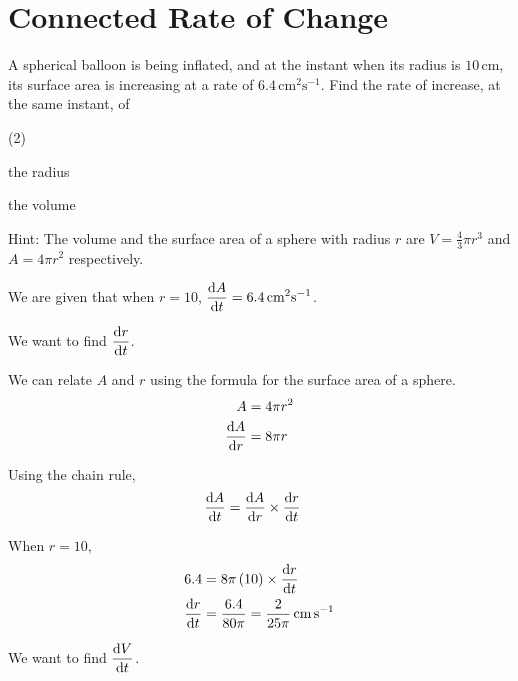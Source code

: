\documentclass[11pt,a4paper]{book}
\begin{document}
\newpage{}

\section{Connected Rate of Change}

\begin{example}

A spherical balloon is being inflated, and at the instant when its
radius is $10\,\text{cm}$, its surface area is increasing at a rate
of $6.4\,\text{cm}^{2}\text{s}^{-1}$. Find the rate of increase, at the same instant, of

\begin{tasks}[label=(\alph*),label-width=3.5ex](2)

\task  the radius

\task  the volume

\end{tasks}

Hint: The volume and the surface area of a sphere with radius $r$
are ${\displaystyle V=\frac{4}{3}\pi r^{3}}$ and $A=4\pi r^{2}$
respectively.

\Solution

\begin{tasks}[label=(\alph*),label-width=3.5ex]

\task  We are given that when $r=10$, ${\displaystyle \frac{{\rm d}A}{{\rm d}t}=6.4\,\text{cm}^{2}\text{s}^{-1}}$.

We want to find ${\displaystyle \frac{{\rm d}r}{{\rm d}t}}$.

We can relate $A$ and $r$ using the formula for the surface area
of a sphere.
\begin{align*}
A & =4\pi r^{2}\\
\frac{{\rm d}A}{{\rm d}r} & =8\pi r
\end{align*}

Using the chain rule,
\begin{align*}
\frac{{\rm d}A}{{\rm d}t} & =\frac{{\rm d}A}{{\rm d}r}\times\frac{{\rm d}r}{{\rm d}t}
\end{align*}

When $r=10$,
\begin{align*}
6.4 & =8\pi\left(10\right)\times\frac{{\rm d}r}{{\rm d}t}\\
\frac{{\rm d}r}{{\rm d}t} & =\frac{6.4}{80\pi} =\frac{2}{25\pi}\,\text{cm}\,\text{s}^{-1}
\end{align*}

\task  We want to find ${\displaystyle \frac{{\rm d}V}{{\rm d}t}}$.


\end{tasks}
\end{example}
\end{document}
